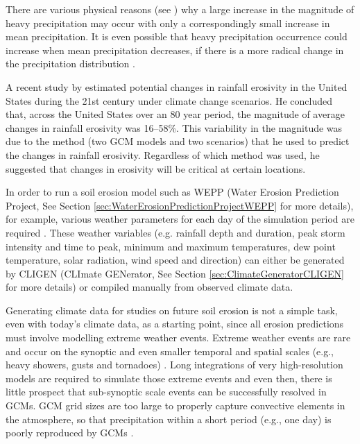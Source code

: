 
There are various physical reasons (see \citealp{trenberth2000-12}) why a large
increase in the magnitude of heavy precipitation may occur with only a
correspondingly small increase in mean precipitation. It is even possible that
heavy precipitation occurrence could increase when mean precipitation decreases,
if there is a more radical change in the precipitation distribution
\citep{osborn2002-1313}.

A recent study by \citet{nearing2001-229} estimated potential changes in
rainfall erosivity in the United States during the 21st century under climate
change scenarios. He concluded that, across the United States over an 80 year
period, the magnitude of average changes in rainfall erosivity was 16--58\%.
This variability in the magnitude was due to the method (two GCM models and
two scenarios) that he used to predict the changes in rainfall erosivity.
Regardless of which method was used, he suggested that changes in erosivity will
be critical at certain locations.

In order to run a soil erosion model such as WEPP (Water Erosion Prediction
Project, See Section \ref{sec:WaterErosionPredictionProjectWEPP} for more
details), for example, various weather parameters for each day of the
simulation period are required \citep{flanagan1995-usda}. These weather
variables (e.g. rainfall depth and duration, peak storm intensity and time to
peak, minimum and maximum temperatures, dew point temperature, solar radiation,
wind speed and direction) can either be generated by CLIGEN (CLImate GENerator,
See Section \ref{sec:ClimateGeneratorCLIGEN} for more details) or compiled
manually from observed climate data.

Generating climate data for studies on future soil erosion is not a simple task,
even with today's climate data, as a starting point, since all erosion
predictions must involve modelling extreme weather events. Extreme weather
events are rare and occur on the synoptic and even smaller temporal and spatial
scales (e.g., heavy showers, gusts and tornadoes)
\citep{schubert1997-223,katz1999-133,coppus2002-1365}. Long integrations of very
high-resolution models are required to simulate those extreme events and even
then, there is little prospect that sub-synoptic scale events can be
successfully resolved in GCMs. GCM grid sizes are too large to properly capture
convective elements in the atmosphere, so that precipitation within a short
period (e.g., one day) is poorly reproduced by GCMs \citep{schubert1997-223}.

